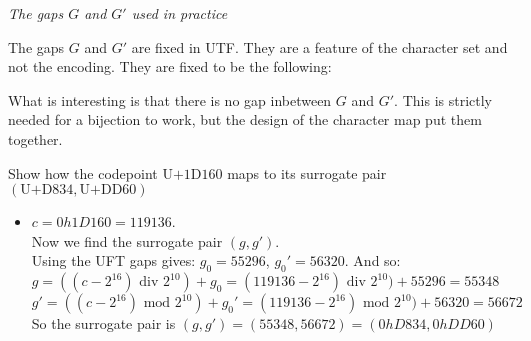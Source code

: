 



\frmrule 

\begin{example}

\end{example}

\frmrule 

\begin{example}

\end{example}

\frmrule 

\textit{The gaps $G$ and $G'$ used in practice }

The gaps $G$ and $G'$ are fixed in UTF. 
They are a feature of the character set and not the 
encoding. They are fixed to be the following:\\


What is interesting is that there is no gap inbetween
$G$ and $G'$. This is strictly needed for a bijection to work,
but the design of the character map put them together.  


\frmrule 

\begin{example}
Show how the codepoint $\text{U+1D160}$ maps to its surrogate pair $(\text{U+D834},\text{U+DD60})$
\begin{itemize}
\item
$c = 0h1D160 = 119136$. \\
Now we find the surrogate pair $(g,g')$. \\
Using the UFT gaps gives: $g_0 = 55296$, $g_0' = 56320$. And so: \\
$g = ((c-2^{16}) \text{ div } 2^{10}) + g_0 = (119136-2^{16}) \text{ div } 2^{10}) + 55296 = 55348$\\
$g' = ((c-2^{16}) \text{ mod } 2^{10}) + g_0' = (119136-2^{16}) \text{ mod } 2^{10}) + 56320 = 56672$\\
So the surrogate pair is $(g,g') = (55348, 56672) = (0hD834, 0hDD60)$

\end{itemize}
\end{example}

\frmrule 





